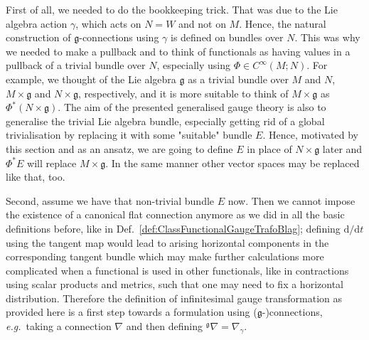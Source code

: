 First of all, we needed to do the bookkeeping trick. That was due to the Lie algebra action $\gamma$, which acts on $N =W$ and not on $M$. Hence, the natural construction of $\mathfrak{g}$-connections using $\gamma$ is defined on bundles over $N$. This was why we needed to make a pullback and to think of functionals as having values in a pullback of a trivial bundle over $N$, especially using $\Phi \in C^\infty(M;N)$. For example, we thought of the Lie algebra $\mathfrak{g}$ as a trivial bundle over $M$ and $N$, $M \times \mathfrak{g}$ and $N \times \mathfrak{g}$, respectively, and it is more suitable to think of $M \times \mathfrak{g}$ as $\Phi^*(N \times \mathfrak{g})$. The aim of the presented generalised gauge theory is also to generalise the trivial Lie algebra bundle, especially getting rid of a global trivialisation by replacing it with some "suitable" bundle $E$. Hence, motivated by this section and as an ansatz, we are going to define $E$ in place of $N \times \mathfrak{g}$ later and $\Phi^*E$ will replace $M \times \mathfrak{g}$. In the same manner other vector spaces may be replaced like that, too.

Second, assume we have that non-trivial bundle $E$ now. Then we cannot impose the existence of a canonical flat connection anymore as we did in all the basic definitions before, like in Def.~\ref{def:ClassFunctionalGaugeTrafoBlag}; defining $\mathrm{d}/\mathrm{d}t$ using the tangent map would lead to arising horizontal components in the corresponding tangent bundle which may make further calculations more complicated when a functional is used in other functionals, like in contractions using scalar products and metrics, such that one may need to fix a horizontal distribution. Therefore the definition of infinitesimal gauge transformation as provided here is a first step towards a formulation using ($\mathfrak{g}$-)connections, \textit{e.g.}~taking a connection $\nabla$ and then defining ${}^{\mathfrak{g}}\nabla = \nabla_\gamma$.

